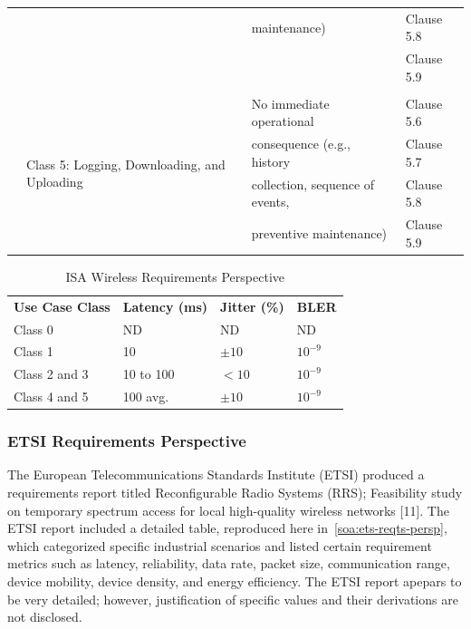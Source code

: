 \begin{table}[!tb]
\begin{adjustbox}{width=\columnwidth,center}
\begin{tabular}{|l|l|p{10.645em}|p{10em}|}
		&       & maintenance)  & Clause 5.8  \\
		&       & \multicolumn{1}{l|}{} & Clause 5.9  \\
		&       & \multicolumn{1}{l|}{} & \multicolumn{1}{l|}{} \\
		\cmidrule{2-4}      & \multicolumn{1}{l|}{\multirow{4}[2]{*}{Class 5:  Logging, Downloading, and Uploading}} & No immediate operational  & Clause 5.6  \\
		&       & consequence (e.g., history  & Clause 5.7  \\
		&       & collection, sequence of events,  & Clause 5.8  \\
		&       & preventive maintenance)  & Clause 5.9  \\
		\bottomrule
	\end{tabular}%

	\end{adjustbox}

	\label{soa:isa-classes}%
\end{table}%


\begin{table}[!tb]
	\centering
	\caption{ISA Wireless Requirements Perspective}
	\label{soa:isa-reqts-persp}%

	\begin{tabular}{|p{10.57em}|p{5.855em}|p{5.855em}|p{5.855em}|}
		\toprule
		\textbf{Use Case Class} & \textbf{Latency (ms)} & \textbf{Jitter (\%)} & \textbf{BLER} \\
		Class 0 & ND    & ND    & ND \\
		\midrule
		Class 1 & \multicolumn{1}{l|}{10} & $\pm10$ & $10^{-9}$ \\
		\midrule
		Class 2 and 3 & 10 to 100 & $<10$ & $10^{-9}$ \\
		\midrule
		Class 4 and 5 & 100 avg. & $\pm10$ & $10^{-9}$ \\
		\bottomrule
	\end{tabular}%
\end{table}%


\subsubsection{ETSI Requirements Perspective}\label{sec:litreview:etsi}

The European Telecommunications Standards Institute (ETSI) produced a requirements report titled Reconfigurable Radio Systems (RRS); Feasibility study on temporary spectrum access for local high-quality wireless networks [11]. The ETSI report included a detailed table, reproduced here in~\ref{soa:ets-reqts-persp}, which categorized specific industrial scenarios and listed certain requirement metrics such as latency, reliability, data rate, packet size, communication range, device mobility, device density, and energy efficiency. The ETSI report apepars to be very detailed; however, justification of specific values and their derivations are not disclosed.

